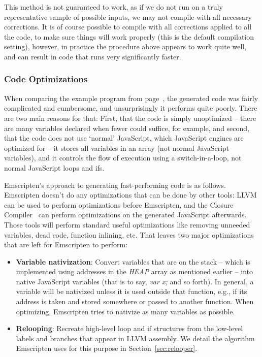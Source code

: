 \documentclass[11pt]{proc}
\begin{document}
This method is not guaranteed to work, as if we do not run on a truly representative
sample of possible inputs, we may not compile with all necessary corrections. It is
of course possible to compile with all corrections applied to all the code, to make
sure things will work properly (this is the default compilation setting), however, in
practice the procedure above appears to work quite well, and can result in code that
runs very significantly faster.

\subsubsection{Code Optimizations}

When comparing the example program from page~\pageref{code:example},
the generated code was fairly complicated
and cumbersome, and unsurprisingly it performs quite poorly. There
are two main reasons for that: First, that the code is simply
unoptimized -- there are many variables declared when fewer could
suffice, for example, and second, that the code does not use `normal'
JavaScript, which JavaScript engines are optimized for -- it
stores all variables in an array (not normal JavaScript variables),
and it controls the flow of execution using a switch-in-a-loop, not
normal JavaScript loops and ifs.

Emscripten's approach to generating fast-performing code is as
follows. Emscripten doesn't do any
optimizations that can be done by other tools:
LLVM can be used to perform optimizations before Emscripten, and
the Closure Compiler~\cite{closure} can perform optimizations on the generated JavaScript afterwards. Those
tools will perform standard useful optimizations like removing unneeded variables, dead code,
function inlining, etc.
That leaves two major optimizations that are left for Emscripten
to perform:
\begin{itemize}
\item \textbf{Variable nativization}: Convert variables
      that are on the stack -- which is implemented using addresses in the \emph{HEAP} array
      as mentioned earlier -- into native JavaScript variables (that is to say, \emph{var x;} and so forth). In general,
      a variable will be nativized unless it is used
      outside that function, e.g., if its address is taken and stored somewhere
      or passed to another function. When optimizing, Emscripten tries to nativize
      as many variables as possible.
\item \textbf{Relooping}: Recreate high-level loop and if structures
      from the low-level labels and branches that appear in LLVM assembly.
      We detail the algorithm Emscripten uses for this purpose in Section~\ref{sec:relooper}.
\end{itemize}
\end{document}
